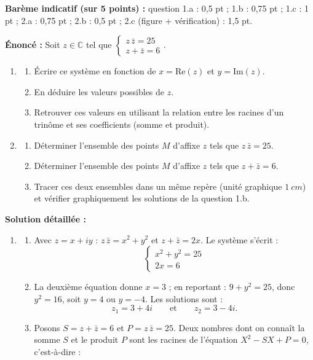 \documentclass[11pt]{article}
\begin{document}
\begin{corrige}
\textbf{Barème indicatif (sur 5 points) :} question 1.a : 0,5 pt ; 1.b : 0,75 pt ; 1.c : 1 pt ; 2.a : 0,75 pt ; 2.b : 0,5 pt ; 2.c (figure + vérification) : 1,5 pt.

\textbf{Énoncé :} Soit $z \in \mathbb{C}$ tel que $\begin{cases} z\,\bar{z} = 25 \\ z + \bar{z} = 6 \end{cases}$.
\begin{enumerate}
\item \begin{enumerate}
\item Écrire ce système en fonction de $x = \mathrm{Re}(z)$ et $y = \mathrm{Im}(z)$.
\item En déduire les valeurs possibles de $z$.
\item Retrouver ces valeurs en utilisant la relation entre les racines d'un trinôme et ses coefficients (somme et produit).
\end{enumerate}
\item \begin{enumerate}
\item Déterminer l'ensemble des points $M$ d'affixe $z$ tels que $z\,\bar{z} = 25$.
\item Déterminer l'ensemble des points $M$ d'affixe $z$ tels que $z + \bar{z} = 6$.
\item Tracer ces deux ensembles dans un même repère (unité graphique $\SI{1}{cm}$) et vérifier graphiquement les solutions de la question 1.b.
\end{enumerate}
\end{enumerate}
\tcblower
\textbf{Solution détaillée :}
\begin{enumerate}
\item 
\begin{enumerate}
\item Avec $z = x+iy$ : $z\,\bar{z} = x^2 + y^2$ et $z + \bar{z} = 2x$. Le système s'écrit :
\[ \begin{cases} x^2 + y^2 = 25 \\ 2x = 6 \end{cases} \]
\item La deuxième équation donne $x = 3$ ; en reportant : $9 + y^2 = 25$, donc $y^2 = 16$, soit $y = 4$ ou $y = -4$. Les solutions sont :
\[ z_1 = 3 + 4i \qquad \text{et} \qquad z_2 = 3 - 4i. \]
\item Posons $S = z + \bar{z} = 6$ et $P = z\,\bar{z} = 25$. Deux nombres dont on connaît la somme $S$ et le produit $P$ sont les racines de l'équation $X^2 - SX + P = 0$, c'est-à-dire :

\end{enumerate}
\end{enumerate}
\end{corrige}
\end{document}
